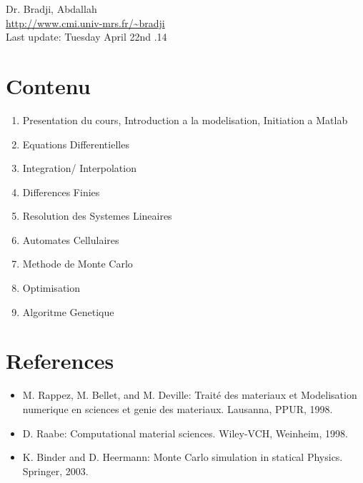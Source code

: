 \documentclass{ab_cv}
\begin{document}
\footnotesize{
\begin{center}
Dr. Bradji, Abdallah\\
\url{http://www.cmi.univ-mrs.fr/~bradji}\\
Last update: Tuesday April 22nd .14 
\end{center}
\section{Contenu}
\begin{enumerate}
\item Presentation du cours, Introduction a la modelisation, Initiation a Matlab
\item Equations Differentielles
\item Integration/ Interpolation
\item Differences Finies
\item Resolution des Systemes Lineaires
\item Automates Cellulaires
\item Methode de Monte Carlo
\item Optimisation
\item Algoritme Genetique

\end{enumerate}
\section{References}
\begin{itemize}
\item M. Rappez, M. Bellet, and M. Deville: Trait\'{e} des materiaux et Modelisation numerique en sciences et genie des materiaux. Lausanna, PPUR, 1998.
\item D. Raabe: Computational material sciences. Wiley-VCH, Weinheim, 1998.
\item K. Binder and D. Heermann: Monte Carlo simulation in statical Physics. Springer, 2003.
\end{itemize}

}
%
\end{document}
